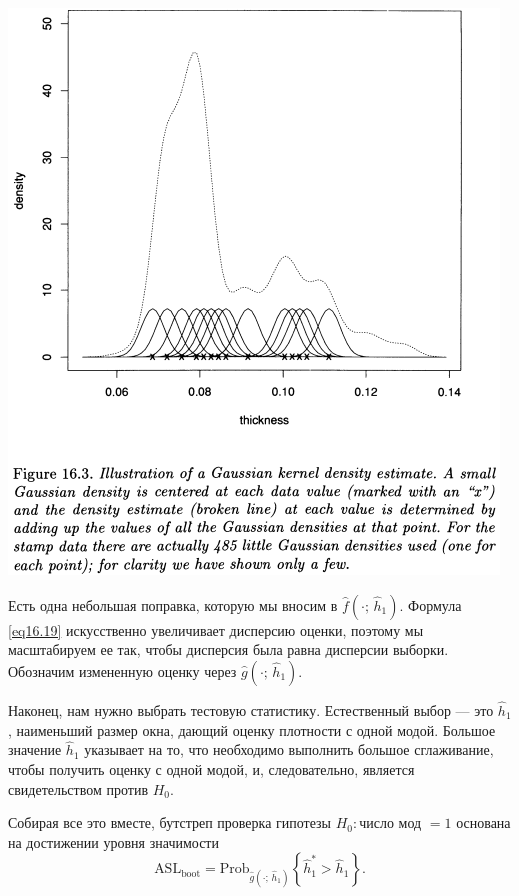 \newpage
\noindent
\includegraphics[width=\linewidth]{16/f16.3.png}

Есть одна небольшая поправка, которую мы вносим в $\hat{f}(\cdot;\, \hat{h}_1)$. Формула \ref{eq16.19} искусственно увеличивает дисперсию оценки, поэтому мы масштабируем ее так, чтобы дисперсия была равна дисперсии выборки. Обозначим измененную оценку через $\hat{g}(\cdot;\, \hat{h}_1)$.

Наконец, нам нужно выбрать тестовую статистику. Естественный выбор --- это $ \hat{h}_1$, наименьший размер окна, дающий оценку плотности с одной модой. Большое значение $ \hat{h}_1$ указывает на то, что необходимо выполнить большое сглаживание, чтобы получить оценку с одной модой, и, следовательно, является свидетельством против $H_0$.

Собирая все это вместе, бутстреп проверка гипотезы $H_0: \text{число мод } = 1$ основана на достижении уровня значимости
\begin{equation}\label{eq16.21}
    \text{ASL}_{\text{boot}} = \text{Prob}_{\hat{g}(\cdot;\, \hat{h}_1)}\left\{\hat{h}^{*}_1 > \hat{h}_1\right\}.
\end{equation}

